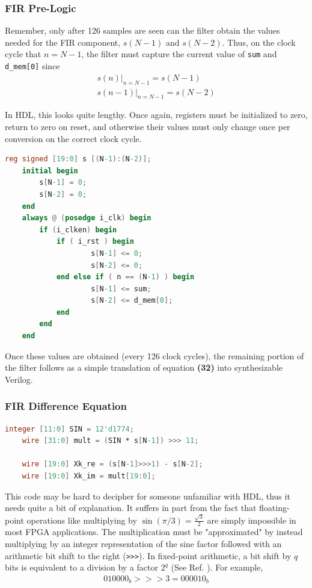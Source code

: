 \documentclass[reprint,amsmath,amssymb]{revtex4-2}
\begin{document}
\subsubsection{FIR Pre-Logic}

Remember, only after 126 samples are seen can the filter obtain the values needed for the FIR component, $s(N-1)$ and $s(N-2)$. Thus, on the clock cycle that $n = N-1$, the filter must capture the current value of \verb|sum| and \verb|d_mem[0]| since
\begin{align}
    \left. s(n) \right|_{n=N-1} = s(N-1) \nonumber \\
    \left. s(n-1) \right|_{n=N-1} = s(N-2)
\end{align}

In HDL, this looks quite lengthy. Once again, registers must be initialized to zero, return to zero on reset, and otherwise their values must only change once per conversion on the correct clock cycle.

\begin{lstlisting}[language=Verilog]
    reg signed [19:0] s [(N-1):(N-2)];
    initial begin
        s[N-1] = 0;
        s[N-2] = 0;
    end
    always @ (posedge i_clk) begin
        if (i_clken) begin
            if ( i_rst ) begin
                    s[N-1] <= 0;
                    s[N-2] <= 0;
            end else if ( n == (N-1) ) begin
                    s[N-1] <= sum;
                    s[N-2] <= d_mem[0];
            end
        end
    end
\end{lstlisting}

Once these values are obtained (every 126 clock cycles), the remaining portion of the filter follows as a simple translation of equation \textbf{(32)} into synthesizable Verilog. 

\subsubsection{FIR Difference Equation}

\begin{lstlisting}[language=Verilog]
    integer [11:0] SIN = 12'd1774;
    wire [31:0] mult = (SIN * s[N-1]) >>> 11;

    wire [19:0] Xk_re = (s[N-1]>>>1) - s[N-2];
    wire [19:0] Xk_im = mult[19:0];  
\end{lstlisting}

This code may be hard to decipher for someone unfamiliar with HDL, thus it needs quite a bit of explanation. It suffers in part from the fact that floating-point operations like multiplying by $\sin(\pi / 3) = \frac{\sqrt{3}}{2}$ are simply impossible in most FPGA applications. The multiplication must be "approximated" by instead multiplying by an integer representation of the sine factor followed with an arithmetic bit shift to the right (\verb|>>>|). In fixed-point arithmetic, a bit shift by $q$ bits is equivalent to a division by a factor $2^q$ (See Ref. \cite{fixed-point}). For example,
\begin{align*}
    010000_b >>> 3 = 000010_b
\end{align*}
\end{document}
